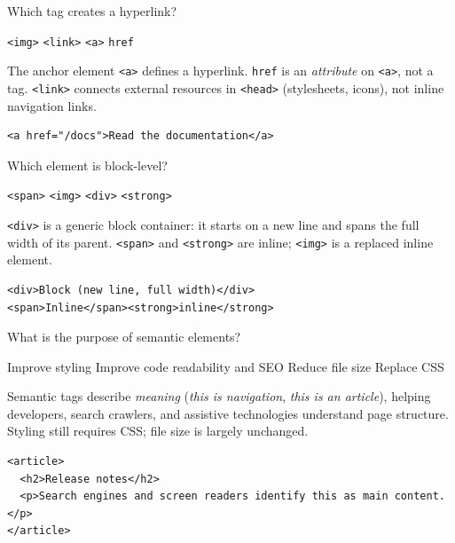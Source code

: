 \question[4]
Which tag creates a hyperlink?
\begin{choices}
  \choice \texttt{<img>}
  \choice \texttt{<link>}
  \CorrectChoice \texttt{<a>}
  \choice \texttt{href}
\end{choices}
\begin{solution}
  The anchor element \lstinline[style=htmlinline]|<a>| defines a hyperlink. \lstinline[style=htmlinline]|href| is an \emph{attribute} on \lstinline[style=htmlinline]|<a>|, not a tag. \lstinline[style=htmlinline]|<link>| connects external resources in \lstinline[style=htmlinline]|<head>| (stylesheets, icons), not inline navigation links.
\begin{lstlisting}[style=htmlinline]
<a href="/docs">Read the documentation</a>
\end{lstlisting}
\end{solution}



\newpage




\question[4]
Which element is block-level?
\begin{choices}
  \choice \texttt{<span>}
  \choice \texttt{<img>}
  \CorrectChoice \texttt{<div>}
  \choice \texttt{<strong>}
\end{choices}
\begin{solution}
  \lstinline[style=htmlinline]|<div>| is a generic block container: it starts on a new line and spans the full width of its parent. \lstinline[style=htmlinline]|<span>| and \lstinline[style=htmlinline]|<strong>| are inline; \lstinline[style=htmlinline]|<img>| is a replaced inline element.
\begin{lstlisting}[style=htmlinline]
<div>Block (new line, full width)</div>
<span>Inline</span><strong>inline</strong>
\end{lstlisting}
\end{solution}

\question[4]
What is the purpose of semantic elements?
\begin{choices}
  \choice Improve styling
  \CorrectChoice Improve code readability and SEO
  \choice Reduce file size
  \choice Replace CSS
\end{choices}
\begin{solution}
  Semantic tags describe \emph{meaning} (\emph{this is navigation}, \emph{this is an article}), helping developers, search crawlers, and assistive technologies understand page structure. Styling still requires CSS; file size is largely unchanged.
\begin{lstlisting}[style=html]
<article>
  <h2>Release notes</h2>
  <p>Search engines and screen readers identify this as main content.</p>
</article>
\end{lstlisting}
\end{solution}

